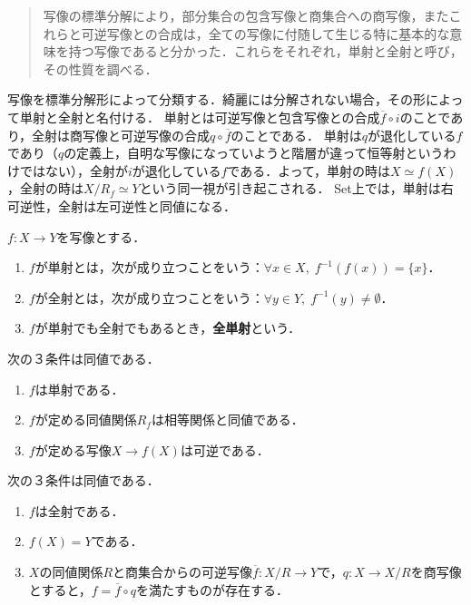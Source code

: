 \documentclass[uplatex,dvipdfmx]{jsreport}
\begin{document}
\begin{screen}
    \begin{quotation}
        写像の標準分解により，部分集合の包含写像と商集合への商写像，またこれらと可逆写像との合成は，全ての写像に付随して生じる特に基本的な意味を持つ写像であると分かった．これらをそれぞれ，単射と全射と呼び，その性質を調べる．
    \end{quotation}
    写像を標準分解形によって分類する．綺麗には分解されない場合，その形によって単射と全射と名付ける．
    単射とは可逆写像と包含写像との合成$\overline{f}\circ i$のことであり，全射は商写像と可逆写像の合成$q\circ\overline{f}$のことである．
    単射は$q$が退化している$f$であり（$q$の定義上，自明な写像になっていようと階層が違って恒等射というわけではない），全射が$i$が退化している$f$である．よって，単射の時は$X≃f(X)$，全射の時は$X/R_f≃Y$という同一視が引き起こされる．
    Set上では，単射は右可逆性，全射は左可逆性と同値になる．
\end{screen}

\begin{definition}
    $f:X\to Y$を写像とする．
    \begin{enumerate}
        \item $f$が単射とは，次が成り立つことをいう：$\forall x\in X,\;f^{-1}(f(x))=\{x\}$．
        \item $f$が全射とは，次が成り立つことをいう：$\forall y\in Y,\;f^{-1}(y)\ne\emptyset$．
        \item $f$が単射でも全射でもあるとき，\textbf{全単射}という．
    \end{enumerate}
\end{definition}

\begin{proposition}[全射と単射の特徴付け]
    次の３条件は同値である．
    \begin{enumerate}
        \item $f$は単射である．
        \item $f$が定める同値関係$R_f$は相等関係と同値である．
        \item $f$が定める写像$X\to f(X)$は可逆である．
    \end{enumerate}
    次の３条件は同値である．
    \begin{enumerate}
        \item $f$は全射である．
        \item $f(X)=Y$である．
        \item $X$の同値関係$R$と商集合からの可逆写像$\overline{f}:X/R\to Y$で，$q:X\to X/R$を商写像とすると，$f=\overline{f}\circ q$を満たすものが存在する．
    \end{enumerate}
\end{proposition}
\end{document}
